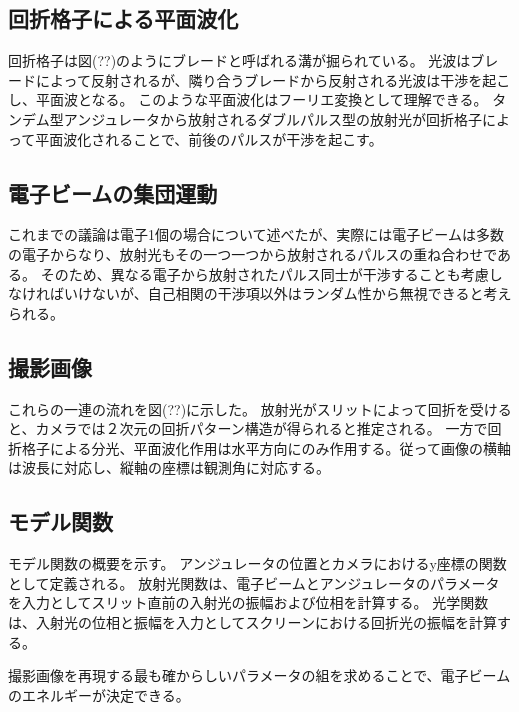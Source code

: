 \documentclass[a4paper,11pt,uplatex]{jsbook}
\begin{document}
\subsection{回折格子による平面波化}\label{sec:grating2}
回折格子は図(??)のようにブレードと呼ばれる溝が掘られている。
光波はブレードによって反射されるが、隣り合うブレードから反射される光波は干渉を起こし、平面波となる。
このような平面波化はフーリエ変換として理解できる。
タンデム型アンジュレータから放射されるダブルパルス型の放射光が回折格子によって平面波化されることで、前後のパルスが干渉を起こす。
\subsection{電子ビームの集団運動}
これまでの議論は電子1個の場合について述べたが、実際には電子ビームは多数の電子からなり、放射光もその一つ一つから放射されるパルスの重ね合わせである。
そのため、異なる電子から放射されたパルス同士が干渉することも考慮しなければいけないが、自己相関の干渉項以外はランダム性から無視できると考えられる。
\subsection{撮影画像}
これらの一連の流れを図(??)に示した。
放射光がスリットによって回折を受けると、カメラでは２次元の回折パターン構造が得られると推定される。
一方で回折格子による分光、平面波化作用は水平方向にのみ作用する。従って画像の横軸は波長に対応し、縦軸の座標は観測角に対応する。
\subsection{モデル関数}
モデル関数の概要を示す。
アンジュレータの位置とカメラにおけるy座標の関数として定義される。
放射光関数は、電子ビームとアンジュレータのパラメータを入力としてスリット直前の入射光の振幅および位相を計算する。
光学関数は、入射光の位相と振幅を入力としてスクリーンにおける回折光の振幅を計算する。

撮影画像を再現する最も確からしいパラメータの組を求めることで、電子ビームのエネルギーが決定できる。
\end{document}
